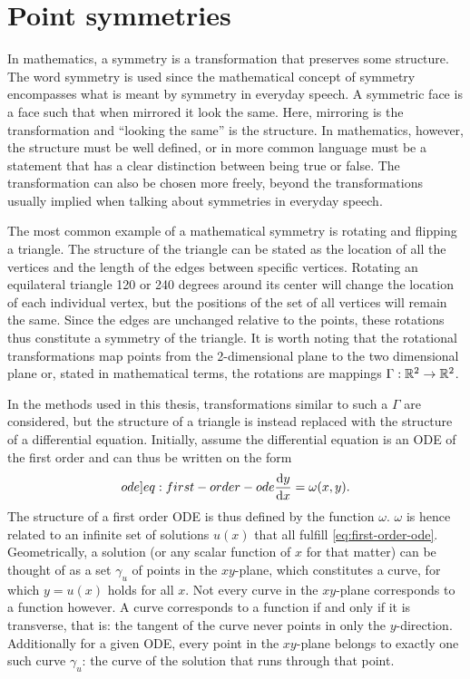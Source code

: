 \section{Point symmetries}

In mathematics, a symmetry is a transformation that preserves some structure.
The word symmetry is used since the mathematical concept of symmetry encompasses what is meant by symmetry in everyday speech.
A symmetric face is a face such that when mirrored it look the same.
Here, mirroring is the transformation and \enquote{looking the same} is the structure.
In mathematics, however, the structure must be well defined, or in more common language must be a statement that has a clear distinction between being true or false.
The transformation can also be chosen more freely, beyond the transformations usually implied when talking about symmetries in everyday speech.

The most common example of a mathematical symmetry is rotating and flipping a triangle.
The structure of the triangle can be stated as the location of all the vertices and the length of the edges between specific vertices.
Rotating an equilateral triangle 120 or 240 degrees around its center will change the location of each individual vertex, but the positions of the set of all vertices will remain the same.
Since the edges are unchanged relative to the points, these rotations thus constitute a symmetry of the triangle.
It is worth noting that the rotational transformations map points from the 2-dimensional plane to the two dimensional plane or, stated in mathematical terms, the rotations are mappings \(\Gamma: \mathbb{R}^2 \to \mathbb{R}^2\).

In the methods used in this thesis, transformations similar to such a \(\Gamma\) are considered, but the structure of a triangle is instead replaced with the structure of a differential equation.
Initially, assume the differential equation is an ODE of the first order and can thus be written on the form
\begin{equation} \label[ode]{eq:first-order-ode}
  \diff{y}{x} = \omega(x,y).
\end{equation}
The structure of a first order ODE is thus defined by the function \(\omega\).
\(\omega\) is hence related to an infinite set of solutions \(u(x)\) that all fulfill \cref{eq:first-order-ode}.
Geometrically, a solution (or any scalar function of \(x\) for that matter) can be thought of as a set \(\gamma_u\) of points in the \(xy\)-plane, which constitutes a curve, for which \(y = u(x)\) holds for all \(x\).
Not every curve in the \(xy\)-plane corresponds to a function however.
A curve corresponds to a function if and only if it is transverse, that is: the tangent of the curve never points in only the \(y\)-direction.
Additionally for a given ODE, every point in the \(xy\)-plane belongs to exactly one such curve \(\gamma_u\): the curve of the solution that runs through that point.

